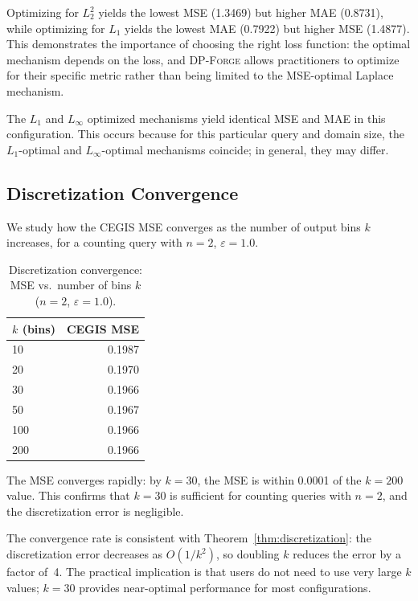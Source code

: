 \documentclass[11pt,a4paper]{article}
\newcommand{\dpforge}{\textsc{DP-Forge}}
\newcommand{\eps}{\varepsilon}
\begin{document}
Optimizing for $L_2^2$ yields the lowest MSE (1.3469) but higher MAE (0.8731),
while optimizing for $L_1$ yields the lowest MAE (0.7922) but higher MSE (1.4877).
This demonstrates the importance of choosing the right loss function: the optimal
mechanism depends on the loss, and \dpforge{} allows practitioners to optimize
for their specific metric rather than being limited to the MSE-optimal Laplace
mechanism.

The $L_1$ and $L_\infty$ optimized mechanisms yield identical MSE and MAE in this
configuration.  This occurs because for this particular query and domain size, the
$L_1$-optimal and $L_\infty$-optimal mechanisms coincide; in general, they may
differ.

\subsection{Discretization Convergence}
\label{subsec:discretization_exp}

We study how the CEGIS MSE converges as the number of output bins $k$ increases,
for a counting query with $n = 2$, $\eps = 1.0$.

\begin{table}[t]
\centering
\caption{Discretization convergence: MSE vs.\ number of bins $k$ ($n=2$, $\eps=1.0$).}
\label{tab:discretization}
\begin{tabular}{@{}lr@{}}
\toprule
$k$ (bins) & CEGIS MSE \\
\midrule
10  & 0.1987 \\
20  & 0.1970 \\
30  & 0.1966 \\
50  & 0.1967 \\
100 & 0.1966 \\
200 & 0.1966 \\
\bottomrule
\end{tabular}
\end{table}

The MSE converges rapidly: by $k = 30$, the MSE is within 0.0001 of the
$k = 200$ value.  This confirms that $k = 30$ is sufficient for counting queries
with $n = 2$, and the discretization error is negligible.

The convergence rate is consistent with Theorem~\ref{thm:discretization}: the
discretization error decreases as $O(1/k^2)$, so doubling $k$ reduces the error
by a factor of~4.  The practical implication is that users do not need to use
very large $k$ values; $k = 30$ provides near-optimal performance for most
configurations.
\end{document}
